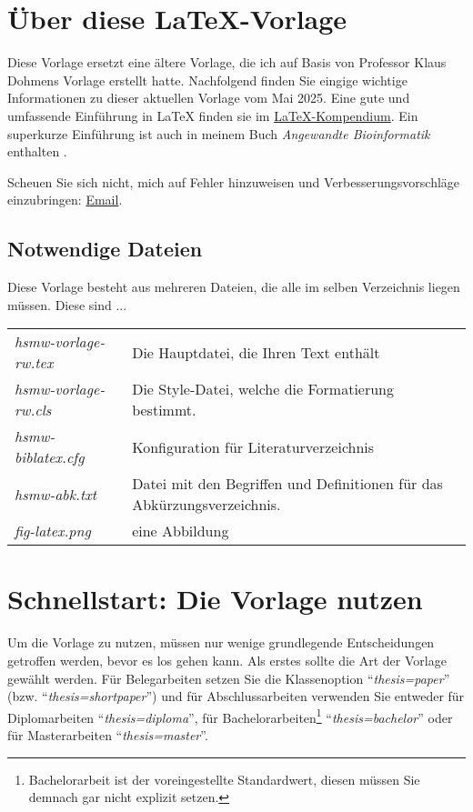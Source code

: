 \chapter{Über diese \LaTeX{}-Vorlage}
Diese Vorlage ersetzt eine ältere Vorlage, die ich auf Basis von Professor Klaus Dohmens Vorlage erstellt hatte. Nachfolgend finden Sie eingige wichtige Informationen zu dieser aktuellen Vorlage vom Mai 2025. Eine gute und umfassende Einführung in \LaTeX{} finden sie im \href{https://de.wikibooks.org/wiki/LaTeX-Kompendium}{LaTeX-Kompendium}. Ein superkurze Einführung ist auch in meinem Buch \textit{Angewandte Bioinformatik} enthalten \citep{Wuenschiers2016kap12}.

Scheuen Sie sich nicht, mich auf Fehler hinzuweisen und Verbesserungsvorschläge einzubringen: \href{mailto:rw@biowasserstoff.de?subject=HSMW LaTeX-Vorlage}{Email}.



\section{Notwendige Dateien}
Diese Vorlage besteht aus mehreren Dateien, die alle im selben Verzeichnis liegen müssen. Diese sind ...

\begin{tabular}{lp{}}
\textit{hsmw-vorlage-rw.tex} & Die Hauptdatei, die Ihren Text enthält \\
\textit{hsmw-vorlage-rw.cls} & Die Style-Datei, welche die Formatierung bestimmt.\\
\textit{hsmw-biblatex.cfg} & Konfiguration für Literaturverzeichnis\\
\textit{hsmw-abk.txt} & Datei mit den Begriffen und Definitionen für das Abkürzungsverzeichnis.\\
\textit{fig-latex.png} & eine Abbildung\\
\end{tabular}
    
    \chapter{Schnellstart: Die Vorlage nutzen}
	
	Um die Vorlage zu nutzen, müssen nur wenige grundlegende Entscheidungen getroffen werden, bevor es los gehen kann.
	Als erstes sollte die Art der Vorlage gewählt werden.
	Für Belegarbeiten setzen Sie die Klassenoption \enquote{\textit{thesis=paper}} (bzw. \enquote{\textit{thesis=shortpaper}}) und für Abschlussarbeiten verwenden Sie entweder für Diplomarbeiten \enquote{\textit{thesis=diploma}}, für Bachelorarbeiten\footnote{Bachelorarbeit ist der voreingestellte Standardwert, diesen müssen Sie demnach gar nicht explizit setzen.} \enquote{\textit{thesis=bachelor}} oder für Masterarbeiten \enquote{\textit{thesis=master}}.
	
